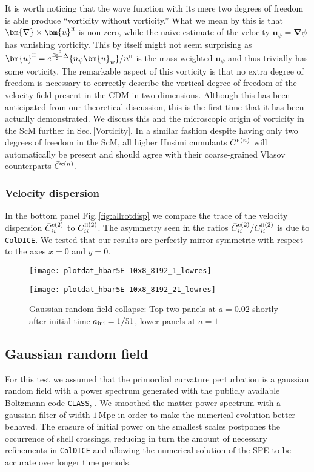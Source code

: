 \documentclass[twocolumn, nofootinbib, showpacs, superscriptaddress]{revtex4-1}
\renewcommand{\H}[0]{{\textsc{h}}}
\newcommand{\sigx}{{\sigma_{\! x}}}
\renewcommand{\c}[0]{{\rm{c}}}
\newcommand{\vu}[0]{\bm{u} }
\newcommand{\vnabla}[0]{\bm{\nabla} }
\begin{document}
It is worth noticing that the wave function with its mere two degrees of freedom is able produce ``vorticity without vorticity.''
What we mean by this is that $\vnabla \times \vu^\H$ is non-zero, while the naive estimate of the velocity $\vu_\psi = \vnabla \phi$ has vanishing vorticity. 
This by itself might not seem surprising as $\vu^\H = e^{\frac{\sigx^2}{2} \Delta} \{n_\psi \vu_\psi \}/ n^\H$ 
is the mass-weighted $\vu_\psi$ and thus trivially has some vorticity.
The remarkable aspect of this vorticity is that no extra degree of freedom is necessary to correctly describe the vortical degree of freedom of the velocity field present in the CDM in two dimensions.
Although this has been anticipated from our theoretical discussion, this is the first time that it has been actually demonstrated.
We discuss this and the microscopic origin of vorticity in the ScM further in Sec.\,\ref{Vorticity}.  
In a similar fashion despite having only two degrees of freedom in the ScM, all 
higher Husimi cumulants $C^{\H (n)}$ will automatically be present and should agree with their coarse-grained Vlasov counterparts $\bar C^{\c(n)}$. 



\subsubsection{Velocity dispersion}
In the bottom panel Fig.\,\ref{fig:allrotdisp}  we compare the trace of the velocity dispersion $\bar C^{\c(2)}_{ii}$ to $C^{\H (2)}_{ii}$. 
The asymmetry seen in the ratios $\bar C^{\c(2)}_{ii}/C^{\H (2)}_{ii}$ is due to \texttt{ColDICE}. 
We tested that our results are perfectly mirror-symmetric with respect to the axes $x=0$ and $y=0$.

\FloatBarrier
\begin{center}
\begin{figure*}[!]
\texttt{[image: plotdat\_hbar5E-10x8\_8192\_1\_lowres]}


\texttt{[image: plotdat\_hbar5E-10x8\_8192\_21\_lowres]}
\caption{Gaussian random field collapse: Top two panels at $a=0.02$ shortly after initial time $a_{\rm ini}=1/51$, lower panels at $a=1$}
\label{fig:gaussian}
\end{figure*}
\end{center}


\subsection{Gaussian random field}
\label{sec:gaussianranfield}
For this test we assumed that the primordial curvature perturbation is a gaussian random field with a
 power spectrum generated with the publicly available Boltzmann code \texttt{CLASS}, \cite{Lesgourgues2011}. 
We smoothed the matter power spectrum with a gaussian filter of width $1$\,Mpc in order to make the numerical evolution better behaved. 
The erasure of initial power on the smallest scales postpones the occurrence of shell crossings, reducing in turn the amount of necessary 
refinements in \texttt{ColDICE} and allowing the numerical solution of the SPE to be accurate over longer time periods.
\end{document}
